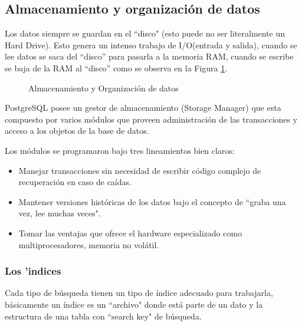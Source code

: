 \subsection{Almacenamiento y organizaci\'on de datos}
Los datos siempre se guardan en el ``disco"  (esto puede no ser literalmente un Hard Drive).
Esto genera un intenso trabajo de I/O(entrada y salida), cuando se lee datos se saca del ``disco'' para pasarla a la memoria RAM, cuando se escribe se baja  de la RAM al ``disco'' como se observa en la Figura \ref{fig:almacenamientoorganizaciondatos}.
\begin{figure}[H]
\centering
{}
\caption{Almacenamiento y Organizaci\'on de datos \cite{postgresqlpordentro}} \label{fig:almacenamientoorganizaciondatos}
\end{figure}
PostgreSQL posee un gestor de almacenamiento (Storage Manager) que esta compuesto por varios m\'odulos que proveen administraci\'on de las transacciones y acceso a los objetos de la base de datos.

Los m\'odulos se programaron bajo tres lineamientos bien claros:
\begin{itemize}
\item Manejar transacciones sin necesidad de escribir c\'odigo complejo de recuperaci\'on en caso de ca\'idas.
\item Mantener versiones hist\'oricas  de los datos bajo el concepto de ``graba una vez, lee muchas veces".
\item Tomar las ventajas que ofrece el hardware especializado como multiprocesadores, memoria no vol\'atil.  
\end{itemize}
\subsubsection{Los 'indices}
Cada tipo de b\'usqueda tienen un tipo de \'indice adecuado para trabajarla, b\'asicamente un \'indice es un
 ``archivo" donde est\'a parte de un dato y la estructura de una tabla con  ``search key"  de b\'usqueda.

